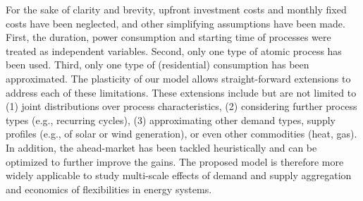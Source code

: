 \documentclass[conference]{IEEEtran}
\begin{document}
For the sake of clarity and brevity, upfront investment costs and monthly fixed costs have been neglected, and other simplifying assumptions have been made. First, the duration, power consumption and starting time of processes were treated as independent variables. Second, only one type of atomic process has been used. Third, only one type of (residential) consumption has been approximated. The plasticity of our model allows straight-forward extensions to address each of these limitations. These extensions include but are not limited to (1) joint distributions over process characteristics, (2) considering further process types (e.g., recurring cycles), (3) approximating other demand types, supply profiles (e.g., of solar or wind generation), or even other commodities (heat, gas). In addition, the ahead-market has been tackled heuristically and can be optimized to further improve the gains. %
The proposed model is therefore more widely applicable to study multi-scale effects of demand and supply aggregation and economics of flexibilities in energy systems.



\balance

\end{document}
